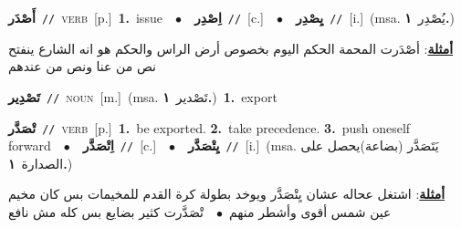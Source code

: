 \documentclass[10pt,a4paper,twoside]{article} %
\begin{document}
\begin{multicols}{2}
{\setlength\topsep{0pt}\textbf{\foreignlanguage{arabic}{أَصْدَر}}\ {\color{gray}\texttt{//}\color{black}}\ \textsc{verb}\ [p.]\ \textbf{1.}~issue\ \ $\bullet$\ \ \setlength\topsep{0pt}\textbf{\foreignlanguage{arabic}{اِصْدِر}}\ {\color{gray}\texttt{//}\color{black}}\ [c.]\ \ $\bullet$\ \ \setlength\topsep{0pt}\textbf{\foreignlanguage{arabic}{يِصْدِر}}\ {\color{gray}\texttt{//}\color{black}}\ [i.]\ \color{gray}(msa. \foreignlanguage{arabic}{يُصْدِر}~\foreignlanguage{arabic}{\textbf{١.}})\color{black}\  \begin{flushright}\color{gray}\foreignlanguage{arabic}{\textbf{\underline{\foreignlanguage{arabic}{أمثلة}}}: أصْدَرت المحمة الحكم اليوم بخصوص أرض الراس والحكم هو انه الشارع ينفتح نص من عنا ونص من عندهم}\end{flushright}\color{black}} \vspace{2mm}

{\setlength\topsep{0pt}\textbf{\foreignlanguage{arabic}{تَصْدِير}}\ {\color{gray}\texttt{//}\color{black}}\ \textsc{noun}\ [m.]\ \color{gray}(msa. \foreignlanguage{arabic}{تَصْدير}~\foreignlanguage{arabic}{\textbf{١.}})\color{black}\ \textbf{1.}~export\ } \vspace{2mm}

{\setlength\topsep{0pt}\textbf{\foreignlanguage{arabic}{تْصَدَّر}}\ {\color{gray}\texttt{//}\color{black}}\ \textsc{verb}\ [p.]\ \textbf{1.}~be exported.  \textbf{2.}~take precedence.  \textbf{3.}~push oneself forward\ \ $\bullet$\ \ \setlength\topsep{0pt}\textbf{\foreignlanguage{arabic}{اِتْصَدَّر}}\ {\color{gray}\texttt{//}\color{black}}\ [c.]\ \ $\bullet$\ \ \setlength\topsep{0pt}\textbf{\foreignlanguage{arabic}{يِتْصَدَّر}}\ {\color{gray}\texttt{//}\color{black}}\ [i.]\ \color{gray}(msa. \foreignlanguage{arabic}{يَتَصَدَّر (بضاعة)يحصل على الصدارة}~\foreignlanguage{arabic}{\textbf{١.}})\color{black}\  \begin{flushright}\color{gray}\foreignlanguage{arabic}{\textbf{\underline{\foreignlanguage{arabic}{أمثلة}}}: اشتغل عحاله عشان يِتْصَدَّر ويوخد بطولة كرة القدم للمخيمات بس كان مخيم عين شمس أقوى وأشطر منهم\ $\bullet$\ \  تْصَدَّرت كثير بضايع بس كله مش نافع}\end{flushright}\color{black}} \vspace{2mm}


\end{multicols}
\end{document}
